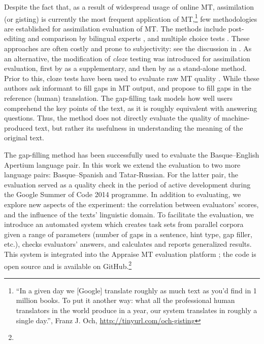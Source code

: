 \documentclass[11pt]{article}
\newcommand{\comment}[1]{\marginpar{\scriptsize\sf \textcolor{blue}{#1}}}
\begin{document}
\comment{EA: I'd like a citation for the ``most massive application'', could you suggest something? It is from Mikel's paper, but no reference there -- should I cite Mikel?}
\comment{MLF: I added a footnote, please reduce and move citation to the reference}
Despite the fact that, as a result of widespread usage of online MT, assimilation (or gisting) is currently the most frequent application of MT,\footnote{“In a given day we [Google] translate roughly as much text as you’d find in 1 million books. To put it another way: what all the professional human translators in the world produce in a year, our system translates in roughly a single day.”, Franz J. Och, \url{http://tinyurl.com/och-gisting}} few methodologies are established for assimilation evaluation of MT. The methods include post-editing and comparison by bilingual experts \citep{ginesti09},\comment{MLF: should we also cite the original WMT reference cited by Ginestí et al.?} and multiple choice tests \citep{jones07,trosterud12}. These approaches are often costly and prone to subjectivity: see the discussion in \cite{oregan13}. As an alternative, the modification of \emph{cloze}\comment{\emph{cloze} stands for \emph{closure}.} testing \citep{taylor53} was introduced for assimilation evaluation, first by \citep{trosterud12} as a supplementary, and then by \citep{oregan13} as a stand-alone method. Prior to this, cloze tests have been used to evaluate raw MT quality \citep{vanslype79,somers00}. While these authors ask informant to fill gaps in MT output, \citet{trosterud12} and \citet{oregan13} propose to fill gaps in the reference (human) translation. The gap-filling task models how well users comprehend the key points of the text, as it is roughly equivalent with answering questions.\comment{MLF: check if you agree with this} Thus, the method does not directly evaluate the quality of machine-produced text, but rather its usefulness in understanding the meaning of the original text. 

\comment{EA: I understand we selected tat-rus and eng-kaz because they were in development. why did we select eu-es?}
The gap-filling method has been successfully used to evaluate the Basque--English Apertium language pair. In this work we extend the evaluation to two more language pairs: Basque--Spanish and Tatar-Russian. For the latter pair, the evaluation served as a quality check in the period of active development during the Google Summer of Code 2014 programme. In addition to evaluating, we explore new aspects of the experiment: the correlation between evaluators' scores, and the influence of the texts' linguistic domain. To facilitate the evaluation, we introduce an automated system which creates task sets from parallel corpora given a range of parameters (number of gaps in a sentence, hint type, gap filler,\comment{MLF: gap filler or gap marker?} etc.), checks evaluators' answers, and calculates and reports generalized results. This system is integrated into the Appraise MT evaluation platform \citep{federmann12}; the code is open source and is available on GitHub.\footnote{}\comment{MLF: check if phantom URL is ok}
\end{document}
